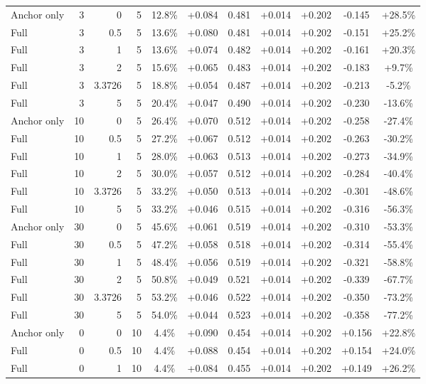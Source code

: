 \begin{table}[htbp]
\begin{tabular}{lrrrccccccc}
Anchor only & 3 & 0 & 5 & 12.8\% & +0.084 & 0.481 & +0.014 & +0.202 & -0.145 & +28.5\% \\
Full & 3 & 0.5 & 5 & 13.6\% & +0.080 & 0.481 & +0.014 & +0.202 & -0.151 & +25.2\% \\
Full & 3 & 1 & 5 & 13.6\% & +0.074 & 0.482 & +0.014 & +0.202 & -0.161 & +20.3\% \\
Full & 3 & 2 & 5 & 15.6\% & +0.065 & 0.483 & +0.014 & +0.202 & -0.183 & +9.7\% \\
Full & 3 & 3.3726 & 5 & 18.8\% & +0.054 & 0.487 & +0.014 & +0.202 & -0.213 & -5.2\% \\
Full & 3 & 5 & 5 & 20.4\% & +0.047 & 0.490 & +0.014 & +0.202 & -0.230 & -13.6\% \\
Anchor only & 10 & 0 & 5 & 26.4\% & +0.070 & 0.512 & +0.014 & +0.202 & -0.258 & -27.4\% \\
Full & 10 & 0.5 & 5 & 27.2\% & +0.067 & 0.512 & +0.014 & +0.202 & -0.263 & -30.2\% \\
Full & 10 & 1 & 5 & 28.0\% & +0.063 & 0.513 & +0.014 & +0.202 & -0.273 & -34.9\% \\
Full & 10 & 2 & 5 & 30.0\% & +0.057 & 0.512 & +0.014 & +0.202 & -0.284 & -40.4\% \\
Full & 10 & 3.3726 & 5 & 33.2\% & +0.050 & 0.513 & +0.014 & +0.202 & -0.301 & -48.6\% \\
Full & 10 & 5 & 5 & 33.2\% & +0.046 & 0.515 & +0.014 & +0.202 & -0.316 & -56.3\% \\
Anchor only & 30 & 0 & 5 & 45.6\% & +0.061 & 0.519 & +0.014 & +0.202 & -0.310 & -53.3\% \\
Full & 30 & 0.5 & 5 & 47.2\% & +0.058 & 0.518 & +0.014 & +0.202 & -0.314 & -55.4\% \\
Full & 30 & 1 & 5 & 48.4\% & +0.056 & 0.519 & +0.014 & +0.202 & -0.321 & -58.8\% \\
Full & 30 & 2 & 5 & 50.8\% & +0.049 & 0.521 & +0.014 & +0.202 & -0.339 & -67.7\% \\
Full & 30 & 3.3726 & 5 & 53.2\% & +0.046 & 0.522 & +0.014 & +0.202 & -0.350 & -73.2\% \\
Full & 30 & 5 & 5 & 54.0\% & +0.044 & 0.523 & +0.014 & +0.202 & -0.358 & -77.2\% \\
Anchor only & 0 & 0 & 10 & 4.4\% & +0.090 & 0.454 & +0.014 & +0.202 & +0.156 & +22.8\% \\
Full & 0 & 0.5 & 10 & 4.4\% & +0.088 & 0.454 & +0.014 & +0.202 & +0.154 & +24.0\% \\
Full & 0 & 1 & 10 & 4.4\% & +0.084 & 0.455 & +0.014 & +0.202 & +0.149 & +26.2\% \\

\end{tabular}
\end{table}
